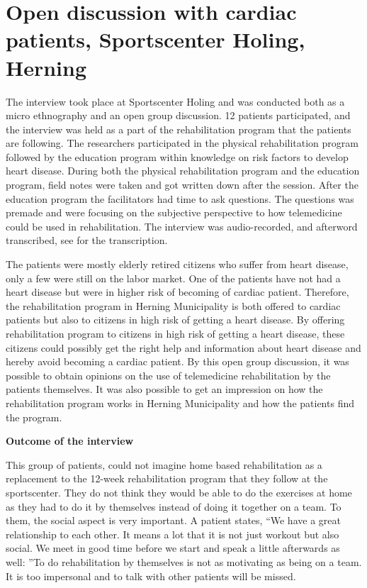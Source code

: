 \section{Open discussion with cardiac patients, Sportscenter Holing, Herning}
\label{patientinterview} 

The interview took place at Sportscenter Holing and was conducted both as a micro ethnography and an open group discussion. 12 patients participated, and the interview was held as a part of the rehabilitation program that the patients are following. The researchers participated in the physical rehabilitation program followed by the education program within knowledge on risk factors to develop heart disease. During both the physical rehabilitation program and the education program, field notes were taken and got written down after the session. After the education program the facilitators had time to ask questions. The questions was premade and were focusing on the subjective perspective to how telemedicine could be used in rehabilitation. The interview was audio-recorded, and afterword transcribed, see  for the transcription. 

The patients were mostly elderly retired citizens who suffer from heart disease, only a few were still on the labor market. One of the patients have not had a heart disease but were in higher risk of becoming of cardiac patient. Therefore, the rehabilitation program in Herning Municipality is both offered to cardiac patients but also to citizens in high risk of getting a heart disease. By offering rehabilitation program to citizens in high risk of getting a heart disease, these citizens could possibly get the right help and information about heart disease and hereby avoid becoming a cardiac patient. By this open group discussion, it was possible to obtain opinions on the use of telemedicine rehabilitation by the patients themselves. It was also possible to get an impression on how the rehabilitation program works in Herning Municipality and how the patients find the program. 

\textbf{Outcome of the interview}

This group of patients, could not imagine home based rehabilitation as a replacement to the 12-week rehabilitation program that they follow at the sportscenter. They do not think they would be able to do the exercises at home as they had to do it by themselves instead of doing it together on a team. To them, the social aspect is very important. A patient states, “We have a great relationship to each other. It means a lot that it is not just workout but also social. We meet in good time before we start and speak a little afterwards as well: ”To do rehabilitation by themselves is not as motivating as being on a team. It is too impersonal and to talk with other patients will be missed. 

